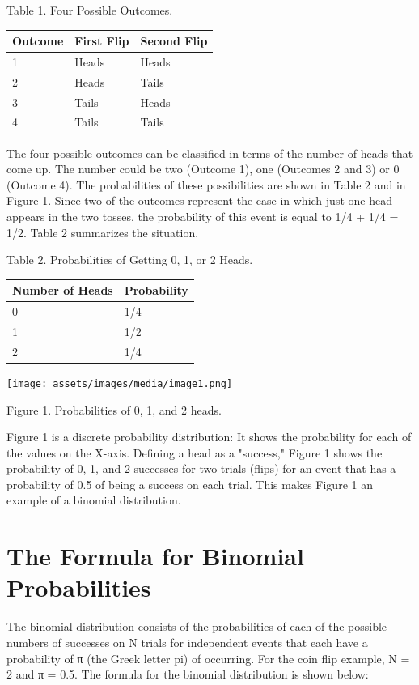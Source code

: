 \documentclass[
  11pt,
,
onecolumn,
openany
]{book}
\begin{document}
Table 1. Four Possible Outcomes.

\begin{longtable}[]{@{}lll@{}}
\toprule
Outcome & First Flip & Second Flip \\
\midrule
\endhead
1 & Heads & Heads \\
2 & Heads & Tails \\
3 & Tails & Heads \\
4 & Tails & Tails \\
\bottomrule
\end{longtable}

The four possible outcomes can be classified in terms of the number of heads
that come up. The number could be two (Outcome 1), one (Outcomes 2 and 3) or 0
(Outcome 4). The probabilities of these possibilities are shown in Table 2 and
in Figure 1. Since two of the outcomes represent the case in which just one
head appears in the two tosses, the probability of this event is equal to 1/4
+ 1/4 = 1/2. Table 2 summarizes the situation.

Table 2. Probabilities of Getting 0, 1, or 2 Heads.

\begin{longtable}[]{@{}ll@{}}
\toprule
Number of Heads & Probability \\
\midrule
\endhead
0 & 1/4 \\
1 & 1/2 \\
2 & 1/4 \\
\bottomrule
\end{longtable}

\texttt{[image: assets/images/media/image1.png]}

Figure 1. Probabilities of 0, 1, and 2 heads.

Figure 1 is a discrete probability distribution: It shows the probability for
each of the values on the X-axis. Defining a head as a "success," Figure 1
shows the probability of 0, 1, and 2 successes for two trials (flips) for an
event that has a probability of 0.5 of being a success on each trial. This
makes Figure 1 an example of a binomial distribution.

\hypertarget{the-formula-for-binomial-probabilities}{%
\section{The Formula for Binomial
Probabilities}\label{the-formula-for-binomial-probabilities}}

The binomial distribution consists of the probabilities of each of the
possible numbers of successes on N trials for independent events that each
have a probability of π (the Greek letter pi) of occurring. For the coin flip
example, N = 2 and π = 0.5. The formula for the binomial distribution is shown
below:
\end{document}
